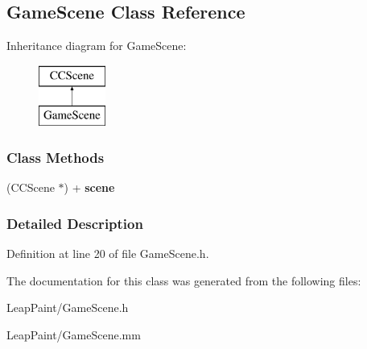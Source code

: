 \hypertarget{interface_game_scene}{\subsection{Game\-Scene Class Reference}
\label{d5/d01/interface_game_scene}
}
Inheritance diagram for Game\-Scene\-:\begin{figure}[H]
\begin{center}
\leavevmode
\includegraphics[height=2.000000cm]{d5/d01/interface_game_scene}
\end{center}
\end{figure}
\subsubsection*{Class Methods}
\begin{DoxyCompactItemize}
\item 
\hypertarget{interface_game_scene_a7198e3569faa9c3e586cd3dcd88b44fc}{(C\-C\-Scene $\ast$) + {\bfseries scene}}\label{d5/d01/interface_game_scene_a7198e3569faa9c3e586cd3dcd88b44fc}

\end{DoxyCompactItemize}


\subsubsection{Detailed Description}


Definition at line 20 of file Game\-Scene.\-h.



The documentation for this class was generated from the following files\-:\begin{DoxyCompactItemize}
\item 
Leap\-Paint/Game\-Scene.\-h\item 
Leap\-Paint/Game\-Scene.\-mm\end{DoxyCompactItemize}

